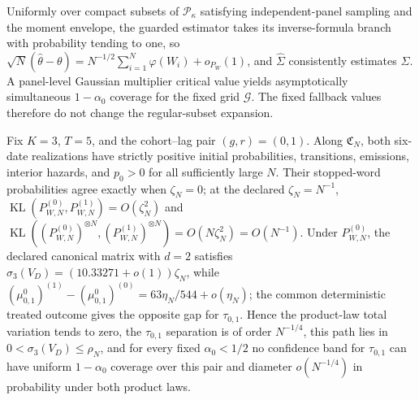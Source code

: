 Uniformly over compact subsets of \(\mathcal P_{\kappa}\) satisfying independent-panel sampling and the moment envelope, the guarded estimator takes its inverse-formula branch with probability tending to one, so \(\sqrt N(\widehat\theta-\theta)=N^{-1/2}\sum_{i=1}^N\varphi(W_i)+o_{P_W}(1)\), and \(\widehat\Sigma\) consistently estimates \(\Sigma\).  A panel-level Gaussian multiplier critical value yields asymptotically simultaneous \(1-\alpha_0\) coverage for the fixed grid \(\mathcal G\).  The fixed fallback values therefore do not change the regular-subset expansion.

Fix \(K=3\), \(T=5\), and the cohort--lag pair \((g,r)=(0,1)\).  Along \(\mathfrak C_N\), both six-date realizations have strictly positive initial probabilities, transitions, emissions, interior hazards, and \(p_0>0\) for all sufficiently large \(N\).  Their stopped-word probabilities agree exactly when \(\zeta_N=0\); at the declared \(\zeta_N=N^{-1}\), \(\operatorname{KL}(P_{W,N}^{(0)},P_{W,N}^{(1)})=O(\zeta_N^2)\) and \(\operatorname{KL}((P_{W,N}^{(0)})^{\otimes N},(P_{W,N}^{(1)})^{\otimes N})=O(N\zeta_N^2)=O(N^{-1})\).  Under \(P_{W,N}^{(0)}\), the declared canonical matrix with \(d=2\) satisfies \(\sigma_3(V_D)=(10.33271+o(1))\zeta_N\), while \((\mu^0_{0,1})^{(1)}-(\mu^0_{0,1})^{(0)}=63\eta_N/544+o(\eta_N)\); the common deterministic treated outcome gives the opposite gap for \(\tau_{0,1}\).  Hence the product-law total variation tends to zero, the \(\tau_{0,1}\) separation is of order \(N^{-1/4}\), this path lies in \(0<\sigma_3(V_D)\le\rho_N\), and for every fixed \(\alpha_0<1/2\) no confidence band for \(\tau_{0,1}\) can have uniform \(1-\alpha_0\) coverage over this pair and diameter \(o(N^{-1/4})\) in probability under both product laws.


